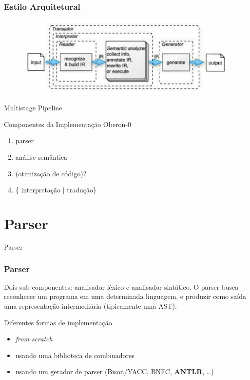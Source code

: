 \documentclass{beamer}
\begin{document}
  \begin{frame}
  \frametitle{Estilo Arquitetural}

  \begin{figure}
    \includegraphics[scale=0.5]{imagens/arquitetura.png}
  \end{figure}
  \begin{center}
     {\color{blue}Multistage Pipeline} \citep{lip-book}
  \end{center}
  \pause
  
  \begin{block}{Componentes da Implementa\c c\~{a}o Oberon-0}
    \begin{enumerate}
     \item parser 
     \item an\'{a}lise sem\^{a}ntica
     \item (otimiza\c c\~{a}o de c\'{o}digo)?
     \item \{ interpreta\c c\~{a}o $\mid$ tradu\c c\~{a}o\}  
    \end{enumerate}
  \end{block}
\end{frame}

\section{Parser}
  
\begin{frame}
\huge{Parser} 
\end{frame}
\begin{frame}
  \frametitle{Parser}

  Dois sub-componentes: {\color{blue}analisador l\'{e}xico} e
  {\color{blue}analisador sint\'{a}tico}. O parser busca reconhecer
  um programa em uma determinada linguagem, e produzir
  como sa\'{i}da uma representa\c c\~{a}o intermedi\'{a}ria
  (tipicamente uma AST). 

  \pause
  \begin{block}{Diferentes formas de implementa\c c\~{a}o}
\begin{small}
  \begin{itemize}
   \item \emph{from scratch}
   \item usando uma biblioteca de combinadores
   \item usando um gerador de parser (Bison/YACC, BNFC, {\bf ANTLR}, \ldots)  
  \end{itemize}
\end{small}
\end{block}
  
\end{frame}
\end{document}
